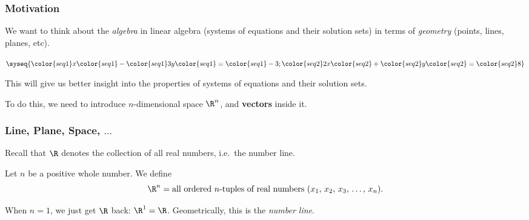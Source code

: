 




\begin{frame}
\frametitle{Motivation}

We want to think about the \emph{algebra} in linear algebra (systems of
equations and their solution sets) in terms of \emph{geometry} (points, lines,
planes, etc).

\pause
\begin{center}
\def\r{\color{seq1}}\def\b{\color{seq2}}
$\syseq{\r x \r- \r3y \r= \r-3; \b2x \b+ \b y \b= \b8 }$
\qquad\longsquiggly\qquad
{}
\end{center}

\bigskip
\pause
This will give us better insight into the properties of systems of equations and
their solution sets.

\bigskip
\pause
To do this, we need to introduce $n$-dimensional space $\R^n$, and
\textbf{vectors} inside it.

\end{frame}



\begin{frame}
\frametitle{Line, Plane, Space, $\ldots$}
Recall that $\R$ denotes the collection of all real numbers, i.e.\ the number
line.
\pause

\begin{defn}
  Let $n$ be a positive whole number.  We define
  \[ \R^n = \text{all ordered } n\text{-tuples of real numbers }
  (x_1,\,x_2,\,x_3,\,\ldots,\,x_n). \]
\end{defn}

\pause

\begin{eg}
  When $n=1$, we just get $\R$ back: $\R^1 = \R$.  Geometrically, this is the
  \emph{number line}.
  \begin{center}
  \end{center}
\end{eg}

\end{frame}


